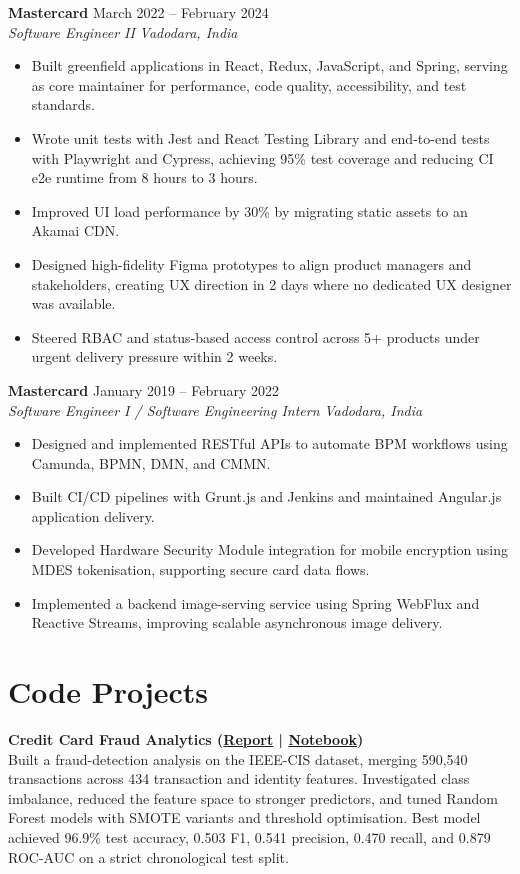 \documentclass[a4paper,10pt]{article}
\newcommand{\role}[4]{
  \textbf{\color{accent}#1} \hfill {\small #2}\\
  \textit{#3} \hfill {\small \textit{#4}}
}
\newcommand{\project}[2]{
  \textbf{\color{accent}#1}\\
  {\small #2}
}
\begin{document}
\role{Mastercard}{March 2022 -- February 2024}{Software Engineer II}{Vadodara, India}
\begin{itemize}
  \item Built greenfield applications in React, Redux, JavaScript, and Spring, serving as core maintainer for performance, code quality, accessibility, and test standards.
  \item Wrote unit tests with Jest and React Testing Library and end-to-end tests with Playwright and Cypress, achieving 95\% test coverage and reducing CI e2e runtime from 8 hours to 3 hours.
  \item Improved UI load performance by 30\% by migrating static assets to an Akamai CDN.
  \item Designed high-fidelity Figma prototypes to align product managers and stakeholders, creating UX direction in 2 days where no dedicated UX designer was available.
  \item Steered RBAC and status-based access control across 5+ products under urgent delivery pressure within 2 weeks.
\end{itemize}

\role{Mastercard}{January 2019 -- February 2022}{Software Engineer I / Software Engineering Intern}{Vadodara, India}
\begin{itemize}
  \item Designed and implemented RESTful APIs to automate BPM workflows using Camunda, BPMN, DMN, and CMMN.
  \item Built CI/CD pipelines with Grunt.js and Jenkins and maintained Angular.js application delivery.
  \item Developed Hardware Security Module integration for mobile encryption using MDES tokenisation, supporting secure card data flows.
  \item Implemented a backend image-serving service using Spring WebFlux and Reactive Streams, improving scalable asynchronous image delivery.
\end{itemize}

\section{Code Projects}
\project{Credit Card Fraud Analytics \small{(\href{https://github.com/aymanapatel/qmul-all-projects/blob/main/data-analytics/coursework1/credit-card-report.pdf}{Report} | \href{https://github.com/aymanapatel/qmul-all-projects/blob/main/data-analytics/coursework1/credit-card-notebook.ipynb}{Notebook})}}{Built a fraud-detection analysis on the IEEE-CIS dataset, merging 590,540 transactions across 434 transaction and identity features. Investigated class imbalance, reduced the feature space to stronger predictors, and tuned Random Forest models with SMOTE variants and threshold optimisation. Best model achieved 96.9\% test accuracy, 0.503 F1, 0.541 precision, 0.470 recall, and 0.879 ROC-AUC on a strict chronological test split.}
\end{document}
